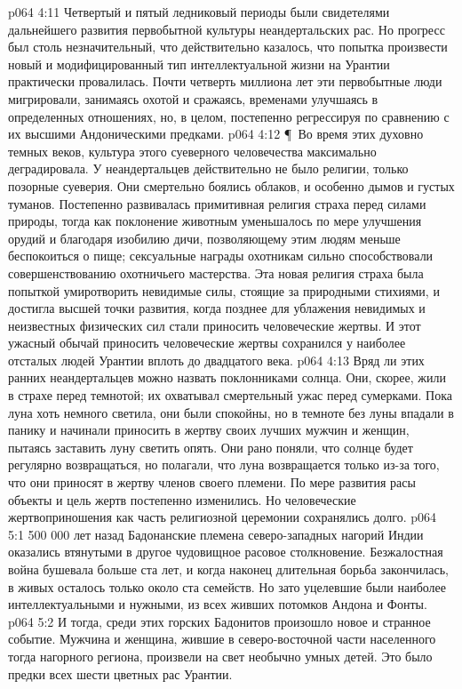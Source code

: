 \vs p064 4:11 Четвертый и пятый ледниковый периоды были свидетелями дальнейшего развития первобытной культуры неандертальских рас. Но прогресс был столь незначительный, что действительно казалось, что попытка произвести новый и модифицированный тип интеллектуальной жизни на Урантии практически провалилась. Почти четверть миллиона лет эти первобытные люди мигрировали, занимаясь охотой и сражаясь, временами улучшаясь в определенных отношениях, но, в целом, постепенно регрессируя по сравнению с их высшими Андоническими предками.
\vs p064 4:12 \P\ Во время этих духовно темных веков, культура этого суеверного человечества максимально деградировала. У неандертальцев действительно не было религии, только позорные суеверия. Они смертельно боялись облаков, и особенно дымов и густых туманов. Постепенно развивалась примитивная религия страха перед силами природы, тогда как поклонение животным уменьшалось по мере улучшения орудий и благодаря изобилию дичи, позволяющему этим людям меньше беспокоиться о пище; сексуальные награды охотникам сильно способствовали совершенствованию охотничьего мастерства. Эта новая религия страха была попыткой умиротворить невидимые силы, стоящие за природными стихиями, и достигла высшей точки развития, когда позднее для ублажения невидимых и неизвестных физических сил стали приносить человеческие жертвы. И этот ужасный обычай приносить человеческие жертвы сохранился у наиболее отсталых людей Урантии вплоть до двадцатого века.
\vs p064 4:13 Вряд ли этих ранних неандертальцев можно назвать поклонниками солнца. Они, скорее, жили в страхе перед темнотой; их охватывал смертельный ужас перед сумерками. Пока луна хоть немного светила, они были спокойны, но в темноте без луны впадали в панику и начинали приносить в жертву своих лучших мужчин и женщин, пытаясь заставить луну светить опять. Они рано поняли, что солнце будет регулярно возвращаться, но полагали, что луна возвращается только из\hyp{}за того, что они приносят в жертву членов своего племени. По мере развития расы объекты и цель жертв постепенно изменились. Но человеческие жертвоприношения как часть религиозной церемонии сохранялись долго.
\vs p064 5:1 500 000 лет назад Бадонанские племена северо\hyp{}западных нагорий Индии оказались втянутыми в другое чудовищное расовое столкновение. Безжалостная война бушевала больше ста лет, и когда наконец длительная борьба закончилась, в живых осталось только около ста семейств. Но зато уцелевшие были наиболее интеллектуальными и нужными, из всех живших потомков Андона и Фонты.
\vs p064 5:2 И тогда, среди этих горских Бадонитов произошло новое и странное событие. Мужчина и женщина, жившие в северо\hyp{}восточной части населенного тогда нагорного региона,  произвели на свет необычно умных детей. Это было  предки всех шести цветных рас Урантии.
